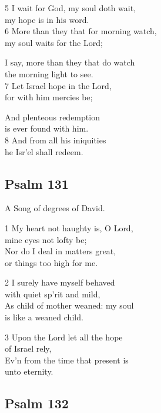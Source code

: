 5 I wait for God, my soul doth wait,\\
my hope is in his word.\\
6 More than they that for morning watch,\\
my soul waits for the Lord;

I say, more than they that do watch\\
the morning light to see.\\
7 Let Israel hope in the Lord,\\
for with him mercies be;

And plenteous redemption\\
is ever found with him.\\
8 And from all his iniquities\\
he Isr’el shall redeem.

\begin{center}
\quad{}\quad{}
\end{center}

\subsection*{Psalm 131}

A Song of degrees of David.

1 My heart not haughty is, O Lord,\\
mine eyes not lofty be;\\
Nor do I deal in matters great,\\
or things too high for me.

2 I surely have myself behaved\\
with quiet sp’rit and mild,\\
As child of mother weaned: my soul\\
is like a weaned child.

3 Upon the Lord let all the hope\\
of Israel rely,\\
Ev’n from the time that present is\\
unto eternity.

\begin{center}
\quad{}\quad{}
\end{center}

\subsection*{Psalm 132}

